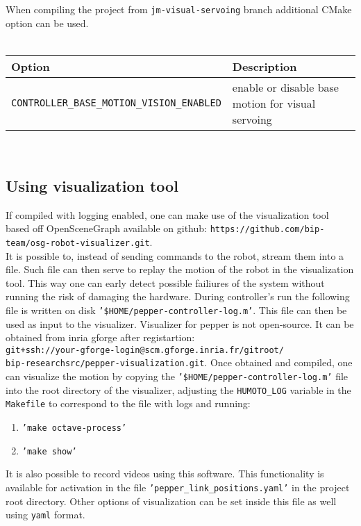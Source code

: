 \noindent When compiling the project from \texttt{jm-visual-servoing} branch additional CMake option can be used. \\ \\
\begin{tabular}{|l|p{5cm}|}
\hline
Option & Description \\
\hline
\texttt{CONTROLLER\_BASE\_MOTION\_VISION\_ENABLED} & enable or disable base motion for visual servoing \\
\hline
\end{tabular} \\

\subsection{Using visualization tool}
\noindent If compiled with logging enabled, one can make use of the visualization tool based off OpenSceneGraph
available on github: \texttt{https://github.com/bip-team/osg-robot-visualizer.git}. \\
\noindent It is possible to, instead of sending commands to the robot, stream them into a file. Such file can then serve
to replay the motion of the robot in the visualization tool. This way one can early detect possible failiures of the
system without running the risk of damaging the hardware. During controller's run the following file is written
on disk \texttt{'\$HOME/pepper-controller-log.m'}. This file can then be used as input to the visualizer.
Visualizer for pepper is not open-source. It can be obtained from inria gforge after registartion:\\
\texttt{git+ssh://your-gforge-login@scm.gforge.inria.fr/gitroot/ \\ bip-researchsrc/pepper-visualization.git}. Once
obtained and compiled, one can visualize the motion by copying the \texttt{'\$HOME/pepper-controller-log.m'} file
into the root directory of the visualizer, adjusting the \texttt{HUMOTO\_LOG} variable in the \texttt{Makefile}
to correspond to the file with logs and running:

\begin{enumerate}
\item \texttt{'make octave-process'} 
\item \texttt{'make show'} 
\end{enumerate}

\noindent It is also possible to record videos using this software. This functionality is available for activation in
the file \texttt{'pepper\_link\_positions.yaml'} in the project root directory. Other options of visualization can be
set inside this file as well using \texttt{yaml} format.
